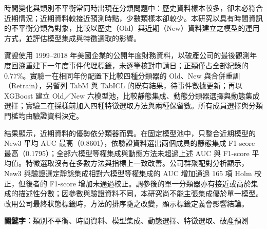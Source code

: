 時間變化與類別不平衡常同時出現在分類問題中：歷史資料樣本較多，卻未必符合近期情況；近期資料較接近預測時點，少數類樣本卻較少。本研究以具有時間資訊的不平衡分類為對象，比較以歷史（Old）與近期（New）資料建立之模型的運用方式，並評估模型集成與特徵選取的影響。

實證使用 1999--2018 年美國企業的公開年度財務資料，以破產公司的最後觀測年度回溯重建下一年度事件代理標籤，未逐筆核對申請日；正類僅占全部紀錄的 0.77\%。實驗一在相同年份配置下比較四種分類器的 Old、New 與合併重訓（Retrain），另暫列 TabM 與 TabICL 的既有結果，待事件數據更新；再以 XGBoost 建立 Old／New 六模型池，比較靜態集成、動態分類器選擇與動態集成選擇；實驗二在採樣前加入四種特徵選取方法與兩種保留數。所有成員選擇與分類門檻均由驗證資料決定。

結果顯示，近期資料的優勢依分類器而異。在固定模型池中，只整合近期模型的 New3 平均 AUC 最高（0.8601），依驗證資料選出兩個成員的靜態集成 F1-score 最高（0.1795）；全部六模型等權集成與動態方法未超過上述 AUC 與 F1-score 平均值。特徵選取沒有在多數方法與指標上一致改善。公司群聚配對分析顯示，New3 與驗證選定靜態集成相對六模型等權集成的 AUC 增加通過 165 項 Holm 校正，但後者的 F1-score 增加未通過校正。調參後的單一分類器亦有接近或高於集成的描述性分數；因參數與驗證資料不同，本研究尚不能主張集成優於單一模型。改用公司最終狀態標籤時，方法的排序隨之改變，顯示標籤定義會影響結論。

\noindent\textbf{關鍵字：}類別不平衡、時間資料、模型集成、動態選擇、特徵選取、破產預測
